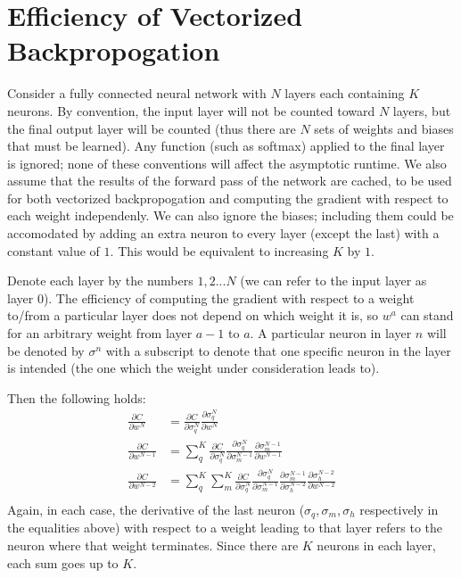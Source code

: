 \documentclass{article}
\begin{document}
   \section{Efficiency of Vectorized Backpropogation}
   Consider a fully connected neural network with $N$ layers each containing $K$ neurons. By convention,
   the input layer will not be counted toward $N$ layers, but the final output layer will be
   counted (thus there are $N$ sets of weights and biases that must be learned). Any function
   (such as softmax) applied to the final layer is ignored; none of these conventions will
   affect the asymptotic runtime. We also assume that the results of the forward pass of the
   network are cached, to be used for both vectorized backpropogation and computing the
   gradient with respect to each weight independenly.
   We can also ignore the biases; including them could be accomodated by adding an extra
   neuron to every layer (except the last) with a constant value of $1$. This would be
   equivalent to increasing $K$ by $1$.

   Denote each layer by the numbers $1,2... N$ (we can refer to the input layer as layer $0$).
   The efficiency of computing the gradient with respect to a weight to/from a particular layer
   does not depend on which weight it is, so $w^{a}$ can stand for an arbitrary weight from
   layer $a-1$ to $a$. A particular neuron in layer $n$ will be denoted by $\sigma^n$ with a
   subscript to denote that one specific neuron in the layer is intended (the one which the
   weight under consideration leads to).

   Then the following holds: %
      \begin{equation*} \begin{split}
        \frac{ \partial C}{ \partial w^{N} }
           &= \frac{ \partial C}{ \partial \sigma^N_q }  \frac{ \partial \sigma^N_q}{ \partial w^{N} } \\
        \frac{ \partial C}{ \partial w^{N-1} }
           &= \sum_q^K \frac{ \partial C}{ \partial \sigma^{N}_q }  \frac{ \partial \sigma^{N}_q }{\partial \sigma^{N-1}_m}  \frac{ \partial \sigma^{N-1}_m }{ \partial w^{N-1} } \\
        \frac{ \partial C}{ \partial w^{N-2} }
           &= \sum_q^K \sum_m^K \frac{ \partial C}{ \partial \sigma^{N}_q }  \frac{ \partial \sigma^{N}_q }{\partial \sigma^{N-1}_m}   \frac{ \partial \sigma^{N-1}_m }{\partial \sigma^{N-2}_h}   \frac{ \partial \sigma^{N-2}_h }{ \partial w^{N-2} } \\
      \end{split} \end{equation*}
   Again, in each case, the derivative of the last neuron ($\sigma_q, \sigma_m, \sigma_h$ respectively in the
   equalities above) with respect to a weight leading to that layer refers to the neuron where
   that weight terminates.
   Since there are $K$ neurons in each layer, each sum goes up to $K$.
\end{document}
